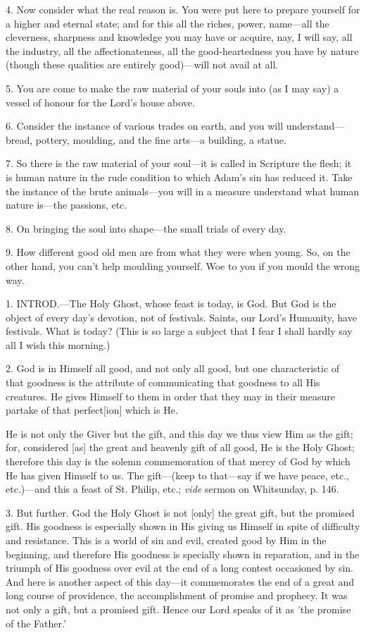 4. Now consider what the real reason is. You were
put here to prepare yourself for a higher and eternal state; and for
this all the riches, power, name—all the cleverness, sharpness and
knowledge you may have or acquire, nay, I will say, all the industry,
all the affectionateness, all the good-heartedness you have by nature
(though these qualities are entirely good)—will not avail at all.

5. You are come to make the raw material of your
souls into (as I may say) a vessel of honour for the Lord's house
above.

6. Consider the instance of various trades on
earth, and you will understand—bread, pottery, moulding, and the
fine arts—a building, a statue.

7. So there is the raw material of your soul—it
is called in Scripture the flesh; it is human nature in the rude
condition to which Adam's sin has reduced it. Take the instance of the
brute animals—you will in a measure understand what human nature
is—the passions, etc.

8. On bringing the soul into shape—the small
trials of every day.

9. How different good old men are from what they
were when young. So, on the other hand, you can't help moulding
yourself. Woe to you if you mould the wrong way.


1. INTROD.—The
Holy Ghost, whose feast is today, is God. But God is the object of
every day's devotion, not of festivals. Saints, our Lord's Humanity,
have festivals. What is today? (This is so large a subject that I fear
I shall hardly say all I wish this morning.)

2. God is in Himself all good, and not only all
good, but one characteristic of that goodness is the attribute of
communicating that goodness to all His creatures. He gives Himself to
them in order that they may in their measure partake of that
perfect[ion] which is He.

He is not only the Giver but the gift, and this
day we thus view Him as the gift; for, considered [as] the great and
heavenly gift of all good, He is the Holy Ghost; therefore this day is
the solemn commemoration of that mercy of God by which He has given
Himself to us. The gift—(keep to that—say if we have peace, etc.,
etc.)—and this a feast of St. Philip, etc.; \emph{vide} sermon on
Whitsunday, p. 146.

3. But further. God the Holy Ghost is not [only]
the great gift, but the promised gift. His goodness is especially
shown in His giving us Himself in spite of difficulty and resistance.
This is a world of sin and evil, created good by Him in the beginning,
and therefore His goodness is specially shown in reparation, and in
the triumph of His goodness over evil at the end of a long contest
occasioned by sin. And here is another aspect of this day—it
commemorates the end of a great and long course of providence, the
accomplishment of promise and prophecy. It was not only a gift, but a
promised gift. Hence our Lord speaks of it as 'the promise of the
Father.'

